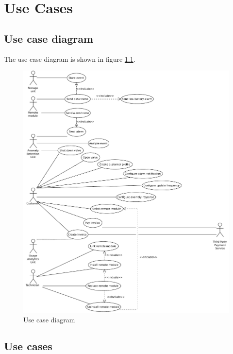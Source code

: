 \chapter{Use Cases}
\label{use-cases}

\section{Use case diagram}

\npar The use case diagram is shown in figure \ref{fig:use-case-diagram}.

\begin{figure}[H]
	\begin{centering}
		\includegraphics[width=\textwidth]{figs/use-case-diagram.pdf}
		\caption{Use case diagram}
		\label{fig:use-case-diagram}
	\end{centering}
\end{figure}

\section{Use cases}

